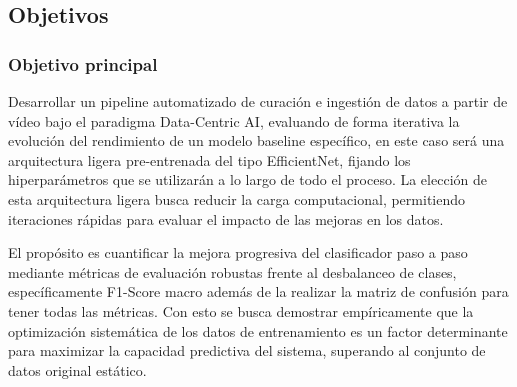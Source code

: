 ﻿\documentclass[10pt,a4paper,twocolumn,twoside]{article}
\begin{document}
\subsection{Objetivos}
\subsubsection{Objetivo principal}
Desarrollar un pipeline automatizado de curación e ingestión de datos a partir de vídeo bajo el paradigma Data-Centric AI, evaluando de forma iterativa la evolución del rendimiento de un modelo baseline específico, en este caso será una arquitectura ligera pre-entrenada del tipo EfficientNet\cite{tan2019efficientnet}, fijando los hiperparámetros que se utilizarán a lo largo de todo el proceso. La elección de esta arquitectura ligera busca reducir la carga computacional, permitiendo iteraciones rápidas para evaluar el impacto de las mejoras en los datos.

El propósito es cuantificar la mejora progresiva del clasificador paso a paso mediante métricas de evaluación robustas frente al desbalanceo de clases, específicamente F1-Score macro además de la realizar la matriz de confusión para tener todas las métricas. Con esto se busca demostrar empíricamente que la optimización sistemática de los datos de entrenamiento es un factor determinante para maximizar la capacidad predictiva del sistema, superando al conjunto de datos original estático.
\end{document}
